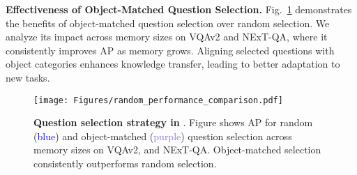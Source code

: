 \noindent {} \textbf{Effectiveness of Object-Matched Question Selection. }Fig.~\ref{fig:random_vs_obj} demonstrates the benefits of object-matched question selection over random selection. We analyze its impact across memory sizes on VQAv2 and NExT-QA, where it consistently improves AP as memory grows. Aligning selected questions with object categories enhances knowledge transfer, leading to better adaptation to new tasks.

\begin{figure}
    \centering
    \texttt{[image: Figures/random\_performance\_comparison.pdf]}
    \caption{\textbf{Question selection strategy in \qstmethodshort{}}. Figure shows AP for random (\textcolor{blue}{blue}) and object-matched (\textcolor{mediumpurple}{purple}) question selection across memory sizes on VQAv2, and NExT-QA. Object-matched selection consistently outperforms random selection.}
    \label{fig:random_vs_obj}
\end{figure}